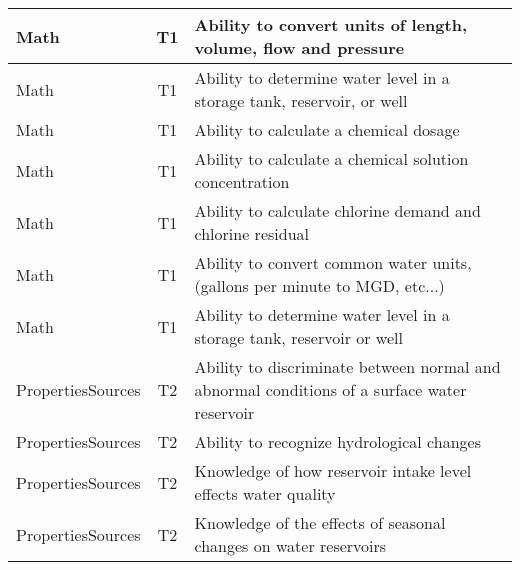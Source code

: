 \documentclass{article}
\begin{document}
\begin{table}[]
\begin{tabular}{|l|c|l|}
Math                                   & T1             & Ability to convert   units of length, volume, flow and pressure                                                                   \\ \hline
Math                                   & T1             & Ability to determine   water level in a storage tank, reservoir, or well                                                          \\ \hline
Math                                   & T1             & Ability to calculate   a chemical dosage                                                                                          \\ \hline
Math                                   & T1             & Ability to calculate   a chemical solution concentration                                                                          \\ \hline
Math                                   & T1             & Ability to calculate   chlorine demand and chlorine residual                                                                      \\ \hline
Math                                   & T1             & Ability to convert   common water units, (gallons per minute to MGD, etc...)                                                      \\ \hline
Math                                   & T1             & Ability to determine   water level in a storage tank, reservoir or well                                                           \\ \hline
PropertiesSources                      & T2             & Ability to   discriminate between normal and abnormal conditions of a surface water   reservoir                                   \\ \hline
PropertiesSources                      & T2             & Ability to recognize   hydrological changes                                                                                       \\ \hline
PropertiesSources                      & T2             & Knowledge of how   reservoir intake level effects water quality                                                                   \\ \hline
PropertiesSources                      & T2             & Knowledge of the   effects of seasonal changes on water reservoirs                                                                \\ \hline

\end{tabular}
\end{table}
\end{document}
